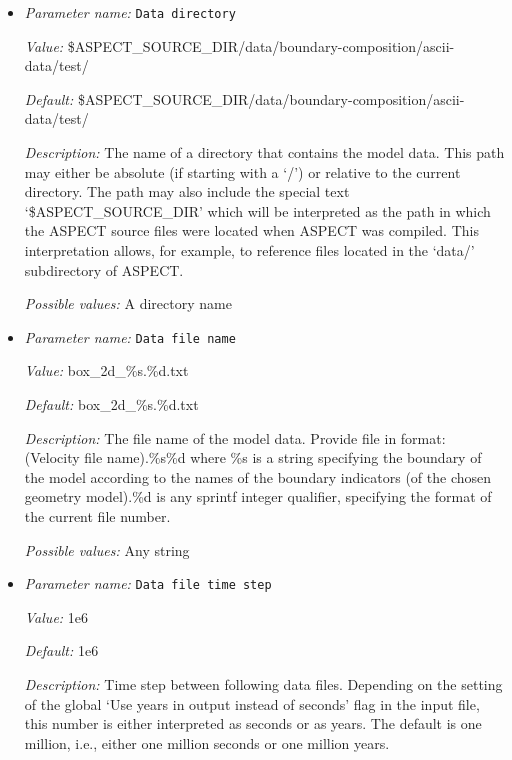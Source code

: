 \begin{itemize}
\item {\it Parameter name:} {\tt Data directory}
\label{parameters:Boundary composition model/Ascii data model/Data directory}


{\it Value:} \$ASPECT\_SOURCE\_DIR/data/boundary-composition/ascii-data/test/


{\it Default:} \$ASPECT\_SOURCE\_DIR/data/boundary-composition/ascii-data/test/


{\it Description:} The name of a directory that contains the model data. This path may either be absolute (if starting with a `/') or relative to the current directory. The path may also include the special text `\$ASPECT\_SOURCE\_DIR' which will be interpreted as the path in which the ASPECT source files were located when ASPECT was compiled. This interpretation allows, for example, to reference files located in the `data/' subdirectory of ASPECT. 


{\it Possible values:} A directory name
\item {\it Parameter name:} {\tt Data file name}
\label{parameters:Boundary composition model/Ascii data model/Data file name}


{\it Value:} box\_2d\_\%s.\%d.txt


{\it Default:} box\_2d\_\%s.\%d.txt


{\it Description:} The file name of the model data. Provide file in format: (Velocity file name).\%s\%d where \%s is a string specifying the boundary of the model according to the names of the boundary indicators (of the chosen geometry model).\%d is any sprintf integer qualifier, specifying the format of the current file number. 


{\it Possible values:} Any string
\item {\it Parameter name:} {\tt Data file time step}
\label{parameters:Boundary composition model/Ascii data model/Data file time step}


{\it Value:} 1e6


{\it Default:} 1e6


{\it Description:} Time step between following data files. Depending on the setting of the global `Use years in output instead of seconds' flag in the input file, this number is either interpreted as seconds or as years. The default is one million, i.e., either one million seconds or one million years.



\end{itemize}
